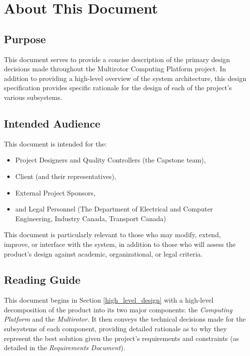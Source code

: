 \documentclass[10pt,letterpaper]{article}
\begin{document}


\section{About This Document}
\subsection{Purpose}
This document serves to provide a concise description of the primary design decisions made throughout the Multirotor Computing Platform project. In addition to providing a high-level overview of the system architecture, this design specification provides specific rationale for the design of each of the project's various subsystems.

\subsection{Intended Audience}
This document is intended for the:
\begin{itemize}
\item Project Designers and Quality Controllers (the Capstone team),
\item Client (and their representatives),
\item External Project Sponsors,
\item and Legal Personnel (The Department of Electrical and Computer Engineering, Industry Canada, Transport Canada)
\end{itemize}

This document is particularly relevant to those who may modify, extend, improve, or interface with the system, in addition to those who will assess the product's design against academic, organizational, or legal criteria.

\subsection{Reading Guide}

This document begins in Section \ref{high_level_design} with a high-level decomposition of the product into its two major components: the \textit{Computing Platform} and the \textit{Multirotor}. It then conveys the technical decisions made for the subsystems of each component, providing detailed rationale as to why they represent the best solution given the project's requirements and constraints (as detailed in the \textit{Requirements Document}). 
\end{document}
